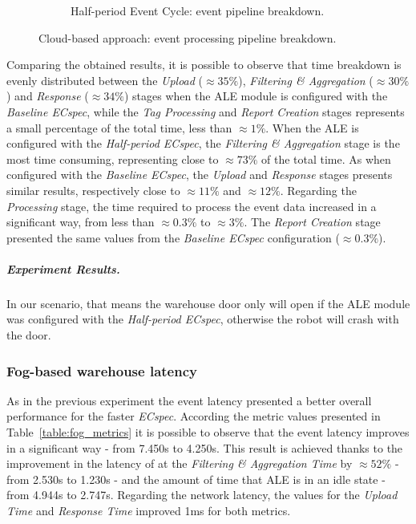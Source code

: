 \begin{figure}[ht!]
\begin{subfigure}{.5\textwidth}
        \caption{Half-period Event Cycle: event pipeline breakdown.}
        \label{fig:ecspecf_effective_half}
      \end{subfigure}
      \caption[Cloud deployment: event processing breakdown.]{Cloud-based approach: event processing pipeline breakdown.}
      \label{fig:ecspecf_effective_breakdown}
    \end{figure}

    Comparing the obtained results, it is possible to observe that time breakdown is evenly distributed
    between the \textit{Upload} ($\approx35\%$), \textit{Filtering \& Aggregation} ($\approx30\%$) and
    \textit{Response} ($\approx34\%$) stages when the \gls{ALE} module is configured with the \textit{Baseline ECspec},
    while the \textit{Tag Processing} and \textit{Report Creation} stages represents a small percentage of the
    total time, less than $\approx1\%$. When the \gls{ALE} is configured with the \textit{Half-period ECspec},
    the \textit{Filtering \& Aggregation} stage is the most time consuming, representing close to $\approx 73\%$
    of the total time. As when configured with the \textit{Baseline ECspec}, the \textit{Upload} and
    \textit{Response} stages presents similar results, respectively close to $\approx11\%$ and $\approx12\%$.
    Regarding the \textit{Processing} stage, the time required to process the event data increased in a significant
    way, from less than $\approx0.3\%$ to $\approx3\%$. The \textit{Report Creation} stage presented the same
    values from the \textit{Baseline ECspec} configuration ($\approx0.3\%$).

    \subparagraph{Experiment Results.}
    \label{subp:cloud_experiment_result}
    In our scenario, that means the warehouse door only will open if the \gls{ALE} module was configured
    with the \textit{Half-period ECspec}, otherwise the robot will crash with the door.

    \subsubsection{Fog-based warehouse latency}
    \label{subs:eval_exp_latency_ecspec}
    As in the previous experiment the event latency presented a better overall performance for the
    faster \textit{ECspec}. According the metric values presented in Table~\ref{table:fog_metrics} it is
    possible to observe that the event latency improves in a significant way - from 7.450s to 4.250s. This
    result is achieved thanks to the improvement in the latency of at the \textit{Filtering \& Aggregation Time}
    by $\approx52\%$ - from 2.530s to 1.230s - and the amount of time that \gls{ALE} is in an idle state -
    from 4.944s to 2.747s. Regarding the network latency, the values for the \textit{Upload Time}
    and \textit{Response Time} improved 1ms for both metrics.\\

